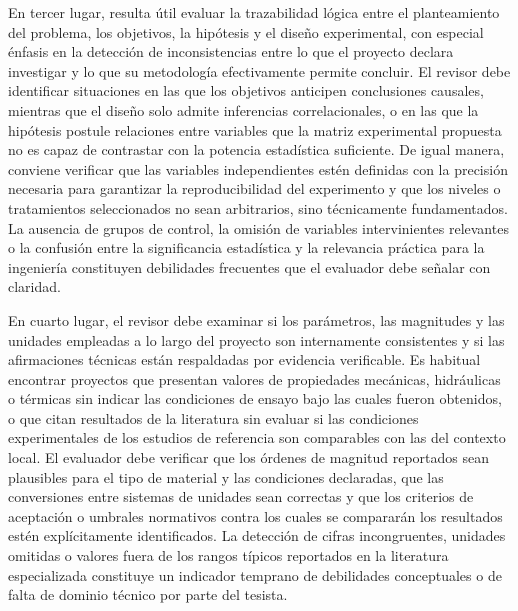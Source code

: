 En tercer lugar, resulta útil evaluar la trazabilidad lógica entre el planteamiento del problema, los objetivos, la hipótesis y el diseño experimental, con especial énfasis en la detección de inconsistencias entre lo que el proyecto declara investigar y lo que su metodología efectivamente permite concluir. El revisor debe identificar situaciones en las que los objetivos anticipen conclusiones causales, mientras que el diseño solo admite inferencias correlacionales, o en las que la hipótesis postule relaciones entre variables que la matriz experimental propuesta no es capaz de contrastar con la potencia estadística suficiente. De igual manera, conviene verificar que las variables independientes estén definidas con la precisión necesaria para garantizar la reproducibilidad del experimento y que los niveles o tratamientos seleccionados no sean arbitrarios, sino técnicamente fundamentados. La ausencia de grupos de control, la omisión de variables intervinientes relevantes o la confusión entre la significancia estadística y la relevancia práctica para la ingeniería constituyen debilidades frecuentes que el evaluador debe señalar con claridad.

En cuarto lugar, el revisor debe examinar si los parámetros, las magnitudes y las unidades empleadas a lo largo del proyecto son internamente consistentes y si las afirmaciones técnicas están respaldadas por evidencia verificable. Es habitual encontrar proyectos que presentan valores de propiedades mecánicas, hidráulicas o térmicas sin indicar las condiciones de ensayo bajo las cuales fueron obtenidos, o que citan resultados de la literatura sin evaluar si las condiciones experimentales de los estudios de referencia son comparables con las del contexto local. El evaluador debe verificar que los órdenes de magnitud reportados sean plausibles para el tipo de material y las condiciones declaradas, que las conversiones entre sistemas de unidades sean correctas y que los criterios de aceptación o umbrales normativos contra los cuales se compararán los resultados estén explícitamente identificados. La detección de cifras incongruentes, unidades omitidas o valores fuera de los rangos típicos reportados en la literatura especializada constituye un indicador temprano de debilidades conceptuales o de falta de dominio técnico por parte del tesista.

